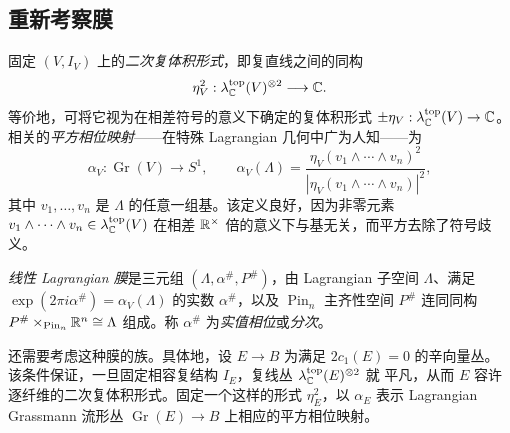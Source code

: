 \subsection{重新考察膜}\label{sec:11j}
固定 $(V,\allowbreak I_V)$ 上的\emph{二次复体积形式}，即复直线之间的同构
\[
\eta_V^2:\lambda_{\mathbb C}^{\mathrm{top}}(V)^{\otimes2}\longrightarrow\mathbb C.
\]
等价地，可将它视为在相差符号的意义下确定的复体积形式 $\pm\eta_V:\lambda_{\mathbb C}^{\mathrm{top}}(V)\to\mathbb C$。相关的\emph{平方相位映射}——在特殊 Lagrangian 几何中广为人知——为
\begin{equation}\label{eq:11.34}
\alpha_V:\operatorname{Gr}(V)\to S^1,\qquad
\alpha_V(\Lambda)=\frac{\eta_V(v_1\wedge\cdots\wedge v_n)^2}{|\eta_V(v_1\wedge\cdots\wedge v_n)|^2},
\end{equation}
其中 $v_1,\allowbreak \ldots,\allowbreak v_n$ 是 $\Lambda$ 的任意一组基。该定义良好，因为非零元素 $v_1\wedge\cdots\wedge v_n\in\lambda_{\mathbb C}^{\mathrm{top}}(V)$ 在相差 $\mathbb R^\times$ 倍的意义下与基无关，而平方去除了符号歧义。
\begin{definition*}
\emph{线性 Lagrangian 膜}是三元组 $(\Lambda,\allowbreak \alpha^\#,\allowbreak P^\#)$，由 Lagrangian 子空间 $\Lambda$、满足 $\exp(2\pi i\alpha^\#)=\alpha_V(\Lambda)$ 的实数 $\alpha^\#$，以及 $\operatorname{Pin}_n$ 主齐性空间 $P^\#$ 连同同构 $P^\#\times_{\operatorname{Pin}_n}\mathbb R^n\cong\Lambda$ 组成。称 $\alpha^\#$ 为\emph{实值相位}或\emph{分次}。
\end{definition*}
还需要考虑这种膜的族。具体地，设 $E\to B$ 为满足 $2c_1(E)=0$ 的辛向量丛。该条件保证，一旦固定相容复结构 $I_E$，复线丛 $\lambda_{\mathbb C}^{\mathrm{top}}(E)^{\otimes2}$ 就
平凡，从而 $E$ 容许逐纤维的二次复体积形式。固定一个这样的形式 $\eta_E^2$，以 $\alpha_E$ 表示 Lagrangian Grassmann 流形丛 $\operatorname{Gr}(E)\to B$ 上相应的平方相位映射。

